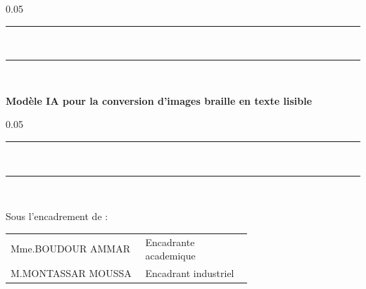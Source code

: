 \begin{titlepage}
\begin{center}
\vspace{20pt} {%
  \begin{spacing}{0.05}
    \rule{420pt}{2pt}\\
    \rule{420pt}{0.75pt}\\
  \end{spacing}
  \renewcommand*{\familydefault}{\defaultFont}
  \fontsize{20pt}{20pt}\selectfont%
  \vspace{20pt}
  \textbf{
Modèle IA pour la conversion d'images braille en texte lisible\\%
  }
  \vspace{10pt}
  \begin{spacing}{0.05}
    \rule{420pt}{0.75pt}\\
    \rule{420pt}{2pt}\\
  \end{spacing}
}

\vspace{40pt}
Sous l'encadrement de :
\\
\vspace{20pt}
\begin{tabular}{p{0.38\linewidth}p{0.3\linewidth}}
  Mme.BOUDOUR AMMAR& Encadrante academique\\
  
  M.MONTASSAR MOUSSA& Encadrant industriel\\
 
\end{tabular}


\vfill

\end{center}
\end{titlepage}